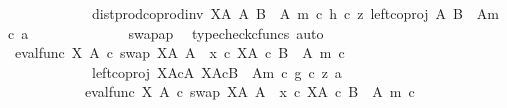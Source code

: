 \begin{isabellebody}
\ \ \ \ \ \ \ \ \ \ \ \ dist{\isacharunderscore}{\kern0pt}prod{\isacharunderscore}{\kern0pt}coprod{\isacharunderscore}{\kern0pt}inv\ {\isacharparenleft}{\kern0pt}X\isactrlbsup A\isactrlesup {\isacharparenright}{\kern0pt}\ A\ {\isacharparenleft}{\kern0pt}B\ {\isasymsetminus}\ {\isacharparenleft}{\kern0pt}A{\isacharcomma}{\kern0pt}\ m{\isacharparenright}{\kern0pt}{\isacharparenright}{\kern0pt}\ {\isasymcirc}\isactrlsub c\ {\isasymlangle}h\ {\isasymcirc}\isactrlsub c\ z{\isacharcomma}{\kern0pt}\ left{\isacharunderscore}{\kern0pt}coproj\ A\ {\isacharparenleft}{\kern0pt}B\ {\isasymsetminus}\ {\isacharparenleft}{\kern0pt}A{\isacharcomma}{\kern0pt}m{\isacharparenright}{\kern0pt}{\isacharparenright}{\kern0pt}\ {\isasymcirc}\isactrlsub c\ a{\isasymrangle}{\isachardoublequoteclose}\isanewline
\ \ \ \ \ \ \ \ \ \ \ \ \isamarkupfalse%
\ swap{\isacharunderscore}{\kern0pt}ap\ \isamarkupfalse%
\ {\isacharparenleft}{\kern0pt}typecheck{\isacharunderscore}{\kern0pt}cfuncs{\isacharcomma}{\kern0pt}\ auto{\isacharparenright}{\kern0pt}\isanewline
\ \ \ \ \ \ \ \ \ \ \isamarkupfalse%
\ \isamarkupfalse%
\ {\isachardoublequoteopen}{\isacharparenleft}{\kern0pt}eval{\isacharunderscore}{\kern0pt}func\ X\ A\ {\isasymcirc}\isactrlsub c\ swap\ {\isacharparenleft}{\kern0pt}X\isactrlbsup A\isactrlesup {\isacharparenright}{\kern0pt}\ A{\isacharparenright}{\kern0pt}\ {\isasymamalg}\ {\isacharparenleft}{\kern0pt}x\ {\isasymcirc}\isactrlsub c\ {\isasymbeta}\isactrlbsub X\isactrlbsup A\isactrlesup \ {\isasymtimes}\isactrlsub c\ {\isacharparenleft}{\kern0pt}B\ {\isasymsetminus}\ {\isacharparenleft}{\kern0pt}A{\isacharcomma}{\kern0pt}\ m{\isacharparenright}{\kern0pt}{\isacharparenright}{\kern0pt}\isactrlesub {\isacharparenright}{\kern0pt}\ {\isasymcirc}\isactrlsub c\isanewline
\ \ \ \ \ \ \ \ \ \ \ \ left{\isacharunderscore}{\kern0pt}coproj\ {\isacharparenleft}{\kern0pt}X\isactrlbsup A\isactrlesup {\isasymtimes}\isactrlsub cA{\isacharparenright}{\kern0pt}\ {\isacharparenleft}{\kern0pt}X\isactrlbsup A\isactrlesup {\isasymtimes}\isactrlsub c{\isacharparenleft}{\kern0pt}B\ {\isasymsetminus}\ {\isacharparenleft}{\kern0pt}A{\isacharcomma}{\kern0pt}m{\isacharparenright}{\kern0pt}{\isacharparenright}{\kern0pt}{\isacharparenright}{\kern0pt}\ {\isasymcirc}\isactrlsub c\ {\isasymlangle}g\ {\isasymcirc}\isactrlsub c\ z{\isacharcomma}{\kern0pt}\ a{\isasymrangle}\isanewline
\ \ \ \ \ \ \ \ \ \ {\isacharequal}{\kern0pt}\ {\isacharparenleft}{\kern0pt}eval{\isacharunderscore}{\kern0pt}func\ X\ A\ {\isasymcirc}\isactrlsub c\ swap\ {\isacharparenleft}{\kern0pt}X\isactrlbsup A\isactrlesup {\isacharparenright}{\kern0pt}\ A{\isacharparenright}{\kern0pt}\ {\isasymamalg}\ {\isacharparenleft}{\kern0pt}x\ {\isasymcirc}\isactrlsub c\ {\isasymbeta}\isactrlbsub X\isactrlbsup A\isactrlesup \ {\isasymtimes}\isactrlsub c\ {\isacharparenleft}{\kern0pt}B\ {\isasymsetminus}\ {\isacharparenleft}{\kern0pt}A{\isacharcomma}{\kern0pt}\ m{\isacharparenright}{\kern0pt}{\isacharparenright}{\kern0pt}\isactrlesub {\isacharparenright}{\kern0pt}\ {\isasymcirc}\isactrlsub c\isanewline

\end{isabellebody}
